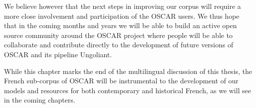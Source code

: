 We believe however that the next steps in improving our corpus will require a more close involvement and participation of the OSCAR users. We thus hope that in the coming months and years we will be able to build an active open source community around the OSCAR project where people will be able to collaborate and contribute directly to the development of future versions of OSCAR and its pipeline Ungoliant.

While this chapter marks the end of the multilingual discussion of this thesis, the French sub-corpus of OSCAR will be instrumental to the development of our models and resources for both contemporary and historical French, as we will see in the coming chapters.
